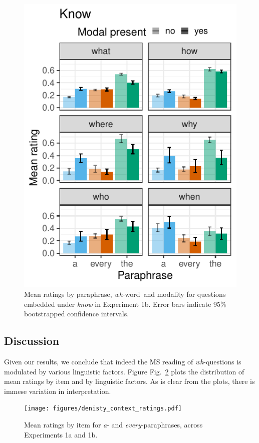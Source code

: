 \documentclass[12pt,letterpaper,table,svgnames,dvipsnames]{article}
\newcommand{\figref}[1]{Fig.~\ref{#1}}
\newcommand{\whw}{\emph{wh}-word~}
\begin{document}
\begin{figure}[h!]
\centering
\includegraphics[scale=1]{figures/modwh_know_context.pdf}
\caption{Mean ratings by paraphrase, \whw and modality for questions embedded under \emph{know} in Experiment 1b. Error bars indicate 95\% bootstrapped confidence intervals.} 
\label{ex1b_modXwh_know}
\end{figure}

\subsection{Discussion}

Given our results, we conclude that indeed the MS reading of \emph{wh}-questions is modulated by various linguistic factors. Figure \figref{exs1_density} plots the distribution of mean ratings by item and by linguistic factors. As is clear from the plots, there is immese variation in interpretation.

\begin{figure}[h!]
\centering
\texttt{[image: figures/denisty\_context\_ratings.pdf]}
\caption{Mean ratings by item for \emph{a}- and \emph{every}-paraphrases, across Experiments 1a and 1b.} 
\label{exs1_density}
\end{figure}
\end{document}
